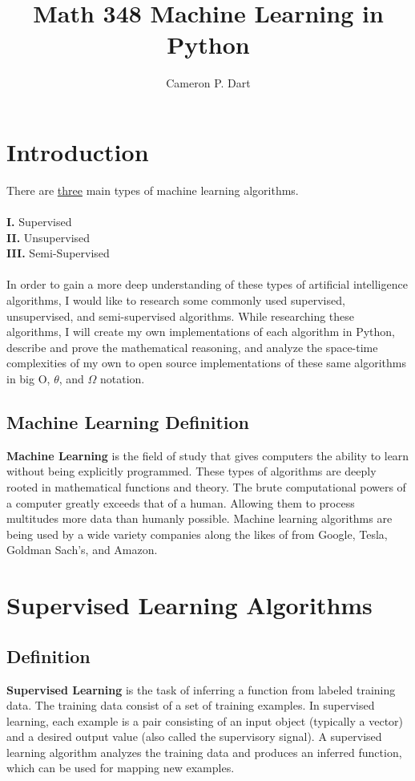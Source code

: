 \documentclass{article}
\begin{document}
\title{Math 348 Machine Learning in Python}
\author{Cameron P. Dart}

\maketitle

\section{Introduction}
There are \underline{three} main types of machine learning algorithms.\\ \\
\textbf{I.} Supervised \\
\textbf{II.} Unsupervised \\
\textbf{III.} Semi-Supervised\\ \\
In order to gain a more deep understanding of these types of artificial intelligence algorithms, I would like to research some commonly used supervised, unsupervised, and semi-supervised algorithms. While researching these algorithms, I will create my own implementations of each algorithm in Python, describe and prove the mathematical reasoning, and analyze the space-time complexities of my own to open source implementations of these same algorithms in big O, $\theta$, and $\Omega$ notation.
\subsection{Machine Learning Definition}
\textbf{Machine Learning} is the field of study that gives computers the ability to learn without being explicitly programmed. These types of algorithms are deeply rooted in mathematical functions and theory. The brute computational powers of a computer greatly exceeds that of a human. Allowing them to process multitudes more data than humanly possible. Machine learning algorithms are being used by a wide variety companies along the likes of from Google, Tesla, Goldman Sach's, and Amazon.
\section{Supervised Learning Algorithms}
\subsection{Definition}
\textbf {Supervised Learning} is the task of inferring a function from labeled training data. The training data consist of a set of training examples. In supervised learning, each example is a pair consisting of an input object (typically a vector) and a desired output value (also called the supervisory signal). A supervised learning algorithm analyzes the training data and produces an inferred function, which can be used for mapping new examples. 
\end{document}
